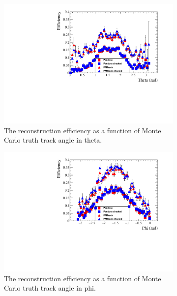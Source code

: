 \begin{figure}[h!]
  \begin{subfigure}{.45\textwidth}
        \centering
        \includegraphics[width=\textwidth]{Effic_ProtonEnrich_500V_Proton_Theta}
        \caption{The reconstruction efficiency as a function of Monte Carlo truth track angle in theta.}
        \label{fig:Prot_Effic_Theta}
  \end{subfigure}
  \hspace{0.08\textwidth}
  \begin{subfigure}{.45\textwidth}
        \centering
        \includegraphics[width=\textwidth]{Effic_ProtonEnrich_500V_Proton_Phi}
        \caption{The reconstruction efficiency as a function of Monte Carlo truth track angle in phi.}
        \label{fig:Prot_Effic_Phi}
  \end{subfigure}
  \begin{subfigure}{.45\textwidth}

\end{subfigure}
\end{figure}
